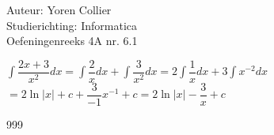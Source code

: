 \documentclass[a4paper]{article}
\newcommand{\intgrl}{\displaystyle\int} %
\begin{document}
\noindent \large Auteur: Yoren Collier \\
\noindent \large Studierichting: Informatica\\
\noindent \large Oefeningenreeks 4A nr. 6.1\\

\medskip

\normalsize

$ \intgrl \dfrac{2x +3}{x^2} dx = \intgrl \dfrac{2}{x} dx + \intgrl \dfrac{3}{x^2} dx = 2 \intgrl \dfrac{1}{x} dx + 3 \intgrl x^{-2} dx$\\

$= 2 \ln |x| +c +\dfrac{3}{-1}x^{-1} +c = 2 \ln |x| -\dfrac{3}{x} +c$\\

\begin{thebibliography}{999}
\end{thebibliography}
\end{document}
